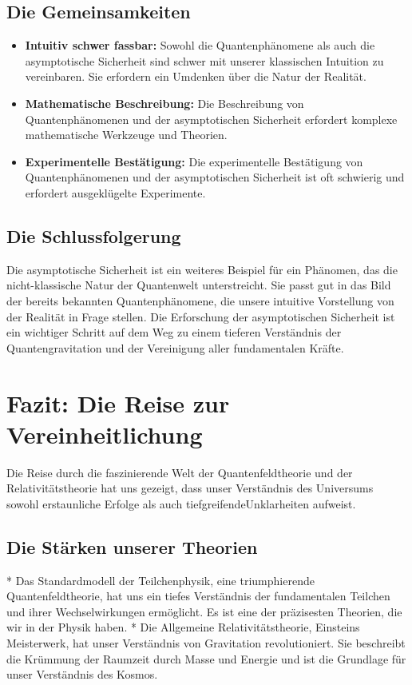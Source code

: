 \documentclass{article}
\begin{document}
\subsection{Die Gemeinsamkeiten}

\begin{itemize}
	\item \textbf{Intuitiv schwer fassbar:} Sowohl die Quantenphänomene als auch die asymptotische Sicherheit sind schwer mit unserer klassischen Intuition zu vereinbaren. Sie erfordern ein Umdenken über die Natur der Realität.
	\item \textbf{Mathematische Beschreibung:} Die Beschreibung von Quantenphänomenen und der asymptotischen Sicherheit erfordert komplexe mathematische Werkzeuge und Theorien.
	\item \textbf{Experimentelle Bestätigung:} Die experimentelle Bestätigung von Quantenphänomenen und der asymptotischen Sicherheit ist oft schwierig und erfordert ausgeklügelte Experimente.
\end{itemize}

\subsection{Die Schlussfolgerung}

Die asymptotische Sicherheit ist ein weiteres Beispiel für ein Phänomen, das die nicht-klassische Natur der Quantenwelt unterstreicht. Sie passt gut in das Bild der bereits bekannten Quantenphänomene, die unsere intuitive Vorstellung von der Realität in Frage stellen. Die Erforschung der asymptotischen Sicherheit ist ein wichtiger Schritt auf dem Weg zu einem tieferen Verständnis der Quantengravitation und der Vereinigung aller fundamentalen Kräfte.

\section{Fazit: Die Reise zur Vereinheitlichung}

Die Reise durch die faszinierende Welt der Quantenfeldtheorie und der Relativitätstheorie hat uns gezeigt, dass unser Verständnis des Universums sowohl erstaunliche Erfolge als auch tiefgreifendeUnklarheiten aufweist.

\subsection{Die Stärken unserer Theorien}

*   Das Standardmodell der Teilchenphysik, eine triumphierende Quantenfeldtheorie, hat uns ein tiefes Verständnis der fundamentalen Teilchen und ihrer Wechselwirkungen ermöglicht. Es ist eine der präzisesten Theorien, die wir in der Physik haben.
*   Die Allgemeine Relativitätstheorie, Einsteins Meisterwerk, hat unser Verständnis von Gravitation revolutioniert. Sie beschreibt die Krümmung der Raumzeit durch Masse und Energie und ist die Grundlage für unser Verständnis des Kosmos.
\end{document}
